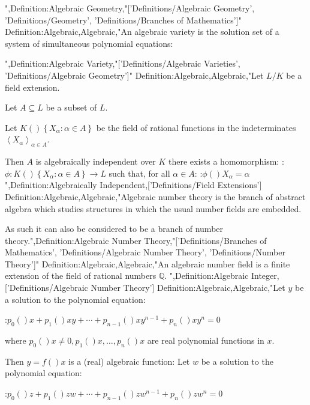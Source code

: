 ",Definition:Algebraic Geometry,"['Definitions/Algebraic Geometry', 'Definitions/Geometry', 'Definitions/Branches of Mathematics']"
Definition:Algebraic,Algebraic,"An algebraic variety is the solution set of a system of simultaneous polynomial equations:






",Definition:Algebraic Variety,"['Definitions/Algebraic Varieties', 'Definitions/Algebraic Geometry']"
Definition:Algebraic,Algebraic,"Let $L / K$ be a field extension.

Let $A \subseteq L$ be a subset of $L$.

Let $K \left(   \right){\left\lbrace X_\alpha: \alpha \in A \right\rbrace }$ be the field of rational functions in the indeterminates $\left\langle X_\alpha \right\rangle_{\alpha \mathop \in A}$.


Then $A$ is algebraically independent over $K$  there exists a homomorphism:
:$\phi: K \left(   \right){\left\lbrace X_\alpha: \alpha \in A \right\rbrace } \to L$
such that, for all $\alpha \in A$:
:$\phi \left(   \right){X_\alpha} = \alpha$",Definition:Algebraically Independent,['Definitions/Field Extensions']
Definition:Algebraic,Algebraic,"Algebraic number theory is the branch of abstract algebra which studies structures in which the usual number fields are embedded.

As such it can also be considered to be a branch of number theory.",Definition:Algebraic Number Theory,"['Definitions/Branches of Mathematics', 'Definitions/Algebraic Number Theory', 'Definitions/Number Theory']"
Definition:Algebraic,Algebraic,"An algebraic number field is a finite extension of the field of rational numbers $\mathbb Q$.
",Definition:Algebraic Integer,['Definitions/Algebraic Number Theory']
Definition:Algebraic,Algebraic,"Let $y$ be a solution to the polynomial equation:

:$p_0 \left(   \right)x + p_1 \left(   \right)x y + \dotsb + p_{n - 1}  \left(   \right)x y^{n - 1} + p_n \left(   \right)x y^n = 0$

where $p_0 \left(   \right)x \ne 0, p_1 \left(   \right)x, \dotsc, p_n \left(   \right)x$ are real polynomial functions in $x$.


Then $y = f \left(   \right)x$ is a (real) algebraic function:
Let $w$ be a solution to the polynomial equation:

:$p_0 \left(   \right)z + p_1 \left(   \right)z w + \dotsb + p_{n - 1}  \left(   \right)z w^{n - 1} + p_n \left(   \right)z w^n = 0$

